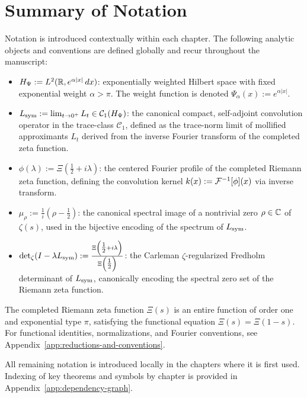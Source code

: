 \section{Summary of Notation}
\label{app:notation-summary}

\noindent
Notation is introduced contextually within each chapter. The following analytic objects and conventions are defined globally and recur throughout the manuscript:

\begin{itemize}
  \item \( H_{\Psi} := L^2(\mathbb{R}, e^{\alpha |x|} \, dx) \): exponentially weighted Hilbert space with fixed exponential weight \( \alpha > \pi \). The weight function is denoted \( \Psi_\alpha(x) := e^{\alpha |x|} \).

  \item \( L_{\mathrm{sym}} := \lim_{t \to 0^+} L_t \in \mathcal{C}_1(H_{\Psi}) \): the canonical compact, self-adjoint convolution operator in the trace-class \( \mathcal{C}_1 \), defined as the trace-norm limit of mollified approximants \( L_t \) derived from the inverse Fourier transform of the completed zeta function.

  \item \( \phi(\lambda) := \Xi\left(\tfrac{1}{2} + i\lambda\right) \): the centered Fourier profile of the completed Riemann zeta function, defining the convolution kernel \( k(x) := \mathcal{F}^{-1}[\phi](x) \) via inverse transform.

  \item \( \mu_\rho := \frac{1}{i}(\rho - \tfrac{1}{2}) \): the canonical spectral image of a nontrivial zero \( \rho \in \mathbb{C} \) of \( \zeta(s) \), used in the bijective encoding of the spectrum of \( L_{\mathrm{sym}} \).

  \item \( \det\nolimits_\zeta(I - \lambda L_{\mathrm{sym}}) := \frac{\Xi\left(\tfrac{1}{2} + i\lambda\right)}{\Xi\left(\tfrac{1}{2}\right)} \): the Carleman \(\zeta\)-regularized Fredholm determinant of \( L_{\mathrm{sym}} \), canonically encoding the spectral zero set of the Riemann zeta function.
\end{itemize}

\noindent
The completed Riemann zeta function \( \Xi(s) \) is an entire function of order one and exponential type \( \pi \), satisfying the functional equation \( \Xi(s) = \Xi(1 - s) \). For functional identities, normalizations, and Fourier conventions, see Appendix~\ref{app:reductions-and-conventions}.

\medskip

\noindent
All remaining notation is introduced locally in the chapters where it is first used. Indexing of key theorems and symbols by chapter is provided in Appendix~\ref{app:dependency-graph}.
